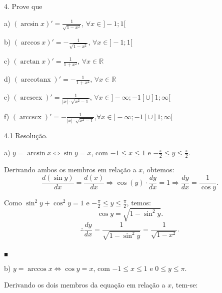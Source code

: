 \documentclass{article}
\begin{document}
{\begin{newpage}
\par
\vspace{0.3cm}
\begin{flushleft}
4. Prove que
\end{flushleft}
\par
a) $(\arcsin{x})' =\displaystyle{\frac{1}{\sqrt{1-x^2}}}$, $\forall x\in ]-1;1[$\par
b) $(\arccos{x})' =\displaystyle{-\frac{1}{\sqrt{1-x^2}}}$, $\forall x\in ]-1;1[$\par
c) $(\arctan{x})' = \displaystyle{\frac{1}{1 + x^2}}$, $\forall x\in\mathbb{R}$\par
d) $(\operatorname{arccotan{x}})' = \displaystyle{-\frac{1}{1 + x^2}}$, $\forall x\in\mathbb{R}$\par
e) $(\operatorname{arcsec{x}})' = \displaystyle{\frac{1}{|x|\cdot\sqrt{x^2 - 1}}}$, $\forall x\in ]-\infty;-1[ \cup ]1;\infty[$\par
f) $(\operatorname{arccsc{x}})' = \displaystyle{-\frac{1}{|x|\cdot\sqrt{x^2 - 1}}}$,$\forall x\in ]-\infty;-1[ \cup ]1;\infty[$
\par
\vspace{0.3cm}
\begin{flushleft}
4.1 Resolução.
\end{flushleft}
\par
a) $y = \arcsin{x} \Leftrightarrow \sin{y} = x$, com $-1\leq x\leq 1$ e $\displaystyle{-\frac{\pi }{2}\leq y\leq\frac{\pi }{2}}$.
\par Derivando ambos os membros em relação a $x$, obtemos:
\begin{equation*} \displaystyle{\frac{d(\sin{y})}{dx} = \frac{d(x)}{dx} \Rightarrow \cos{(y)}\cdot\frac{dy}{dx} = 1 \Rightarrow \frac{dy}{dx} = \frac{1}{\cos{y}}} .\end{equation*}
\par Como $\sin^{2}{y} + \cos^{2}{y} = 1$ e $\displaystyle{-\frac{\pi }{2}\leq y\leq\frac{\pi }{2}}$, temos:
\begin{equation*} \cos{y} = \sqrt{1 - \sin^{2}{y}} .\end{equation*}
$$\therefore \displaystyle{\frac{dy}{dx} = \frac{1}{\sqrt{1 - \sin^{2}{y}}} = \frac{1}{\sqrt{1 - x^2}}}.$$\begin{flushright} $_{\blacksquare }$ \end{flushright}
\par
\vspace{0.3cm}
b) $y=\arccos{x} \Leftrightarrow \cos{y} = x$, com $-1\leq x\leq 1$ e $0\leq y\leq\pi $.
\par Derivando os dois membros da equação em relação a $x$, tem-se:

\end{newpage}}
\end{document}
